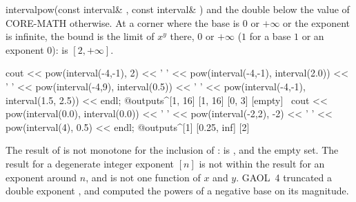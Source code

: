 \documentclass[12pt,a4paper,twoside,openright]{book}
\begin{document}
\begin{deffun}{interval}{pow}{(const interval\& , const interval\& )}
  and the double below the value of CORE-MATH otherwise. At a corner where
  the base is $0$ or $+\infty$ or the exponent is infinite, the bound is the
  limit of $x^y$ there, $0$ or $+\infty$ ($1$ for a base $1$ or an exponent
  $0$):  is $[2, +\infty]$.\newinvfive
\begin{example}
cout << pow(interval(-4,-1), 2) << ' '
     << pow(interval(-4,-1), interval(2.0)) << ' '
     << pow(interval(-4,9), interval(0.5)) << ' '
     << pow(interval(-4,-1), interval(1.5, 2.5)) << endl;
@outputs^[1, 16] [1, 16] [0, 3] [empty]~
cout << pow(interval(0.0), interval(0.0)) << ' '
     << pow(interval(-2,2), -2) << ' '
     << pow(interval(4), 0.5) << endl;
@outputs^[1] [0.25, inf] [2]~
\end{example}
\end{deffun}

\begin{Rem}\label{rem:arithmetic-pow-monotone}
The result of  is not monotone for the inclusion of :
 is , and
 the empty set. The result for a
degenerate integer exponent $[n]$ is not within the result for an exponent
around $n$, and  is not one function of $x$ and $y$. GAOL~4
truncated a double exponent , and computed the powers of a negative
base on its magnitude.
\end{Rem}
\end{document}
